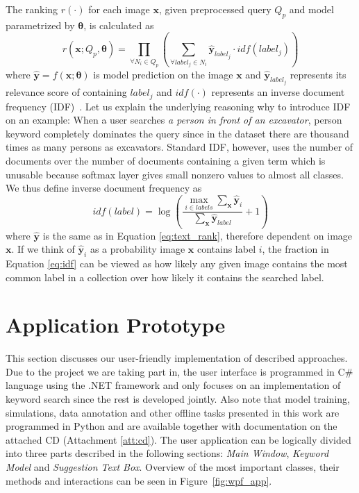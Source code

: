 The ranking $r(\cdot)$ for each image $\bm{x}$, given preprocessed query $Q_p$ and model parametrized by $\bm{\theta}$, is calculated as 
\begin{equation}
r\left(\bm{x}; Q_p, \bm{\theta}\right)=\prod\limits_{\forall N_i \in Q_p}\left(
	\sum\limits_{\forall label_j\in N_i} \bm{\hat{y}}_{label_j}\cdot idf\left(label_j\right)
\right)\label{eq:text_rank}
\end{equation}
where $\bm{\hat{y}}=f\left(\bm{x}; \bm{\theta}\right)$  is model prediction on the image $\bm{x}$ and $\bm{\hat{y}}_{label_j}$ represents its relevance score of containing $label_j$ and $idf(\cdot)$ represents an inverse document frequency (IDF)~\cite{baeza1999modern}. Let us explain the underlying reasoning why to introduce IDF on an example: When a user searches \textit{a person in front of an excavator}, person keyword completely dominates the query since in the dataset there are thousand times as many persons as excavators. Standard IDF, however, uses the number of documents over the number of documents containing a given term which is unusable because softmax layer gives small nonzero values to almost all classes. We thus define inverse document frequency as
\begin{equation}
idf(label) = \log\left(
\frac{
\max\limits_{i\in labels} \sum_{\bm{x}}\hat{\bm{y}}_{i}
}{
\sum_{\bm{x}}\hat{\bm{y}}_{label}
} + 1\right)\label{eq:idf}
\end{equation}
where $\hat{\bm{y}}$ is the same as in Equation \ref{eq:text_rank}, therefore dependent on image $\bm{x}$. If we think of $\hat{\bm{y}}_i$ as a probability image $\bm{x}$ contains label $i$, the fraction in Equation \ref{eq:idf} can be viewed as how likely any given image contains the most common label in a collection over how likely it contains the searched label.

\section{Application Prototype}\label{chap:application_prototype}
This section discusses our user-friendly implementation of described approaches. Due to the project we are taking part in, the user interface is programmed in C\# language using the .NET framework and only focuses on an implementation of keyword search since the rest is developed jointly. Also note that model training, simulations, data annotation and other offline tasks presented in this work are programmed in Python and are available together with documentation on the attached CD (Attachment \ref{att:cd}). The user application can be logically divided into three parts described in the following sections: \textit{Main Window}, \textit{Keyword Model} and \textit{Suggestion Text Box}. Overview of the most important classes, their methods and interactions can be seen in Figure~\ref{fig:wpf_app}.

